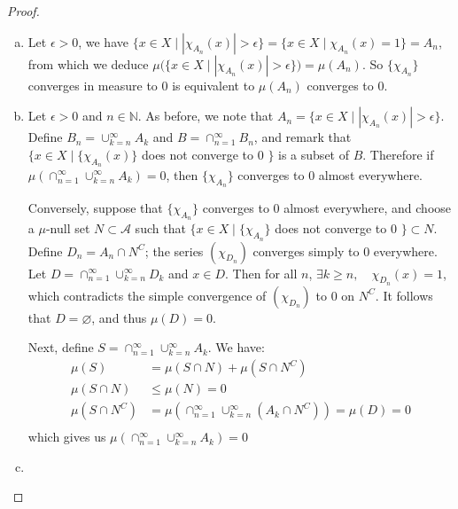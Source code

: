 \documentclass[11pt,a4paper,twoside]{article}
\theoremstyle{definition}
\begin{document}
\begin{proof}\hfill
  \begin{enumerate}[(a)]
  \item
    Let $\epsilon > 0$, we have $\{ x \in X \mid | \chi_{A_n} (x) | > \epsilon \} = \{ x \in X \mid \chi_{A_n} (x) = 1 \} = A_n$, from which we deduce
    $\mu \big( \{ x \in X \mid | \chi_{A_n} (x) | > \epsilon \} \big) = \mu (A_n)$. So $\{ \chi_{A_n} \}$ converges in measure to 0 is equivalent to $\mu (A_n)$ converges to 0.

  \item
    Let $\epsilon > 0$ and $n \in \mathbb{N}$. As before, we note that $A_n = \{ x \in X \mid | \chi_{A_n} (x) | > \epsilon \}$.
    Define $B_n = \cup_{k = n}^\infty A_k$ and $B = \cap_{n = 1}^\infty B_n$, and remark that $\{ x \in X \mid \{ \chi_{A_n} (x) \}$ does not converge to 0 $\}$ is a subset of $B$.
    Therefore if $\mu (\cap_{n = 1}^\infty \cup_{k = n}^\infty A_k) = 0$, then $\{ \chi_{A_n} \}$ converges to 0 almost everywhere.

    Conversely, suppose that $\{ \chi_{A_n} \}$ converges to 0 almost everywhere, and choose a $\mu$-null set $N \subset \mathscr{A}$
    such that $\{ x \in X \mid \{ \chi_{A_n} \}$ does not converge to 0 $\} \subset N$. Define $D_n = A_n \cap N^C$; the series $(\chi_{D_n})$ converges simply to 0 everywhere.
    Let $D = \cap_{n = 1}^\infty \cup_{k = n}^\infty D_k$ and $x \in D$. Then for all $n$, $\exists k \geq n,\quad \chi_{D_n} (x) = 1$,
    which contradicts the simple convergence of $(\chi_{D_n})$ to 0 on $N^C$. It follows that $D = \varnothing$, and thus $\mu (D) = 0$.

    Next, define $S = \cap_{n = 1}^\infty \cup_{k = n}^\infty A_k$. We have:
    \begin{align*}
    \mu (S) &= \mu (S \cap N) + \mu (S \cap N^C)\\
    \mu (S \cap N) &\leq \mu (N) = 0\\
    \mu (S \cap N^C) &= \mu \left( \cap_{n = 1}^\infty \cup_{k = n}^\infty \left( A_k \cap N^C \right) \right) = \mu (D) = 0\\
    \end{align*}
    which gives us $\mu (\cap_{n = 1}^\infty \cup_{k = n}^\infty A_k) = 0$

  \item
    

  \end{enumerate}
\end{proof}
\end{document}
